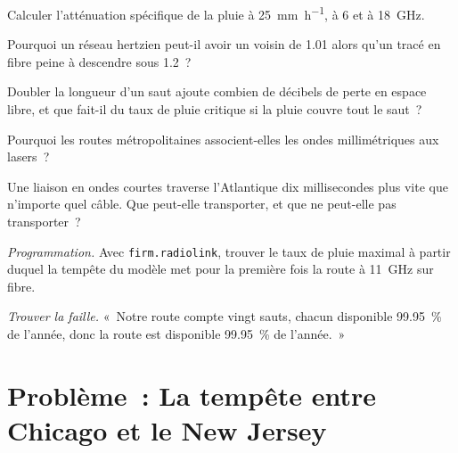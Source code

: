 \begin{exercise}[$\star$]\label{exo:nw:long-haul-wireless:2}
Calculer l'atténuation spécifique de la pluie à \qty{25}{\milli\metre\per\hour}, à 6 et à \qty{18}{\giga\hertz}.
\end{exercise}

\begin{exercise}[$\star$]\label{exo:nw:long-haul-wireless:3}
Pourquoi un réseau hertzien peut-il avoir un  voisin de 1.01 alors qu'un tracé en fibre peine à descendre sous 1.2~?
\end{exercise}

\begin{exercise}[$\star\star$]\label{exo:nw:long-haul-wireless:4}
Doubler la longueur d'un saut ajoute combien de décibels de perte en espace libre, et que fait-il du taux de pluie critique si la pluie couvre tout le saut~?
\end{exercise}

\begin{exercise}[$\star\star$]\label{exo:nw:long-haul-wireless:5}
Pourquoi les routes métropolitaines associent-elles les ondes millimétriques aux lasers~?
\end{exercise}

\begin{exercise}[$\star\star$]\label{exo:nw:long-haul-wireless:6}
Une liaison en ondes courtes traverse l'Atlantique dix millisecondes plus vite que n'importe quel câble. Que peut-elle transporter, et que ne peut-elle pas transporter~?
\end{exercise}

\begin{exercise}[$\star\star\star$]\label{exo:nw:long-haul-wireless:7}
\emph{Programmation.} Avec \texttt{firm.radiolink}, trouver le taux de pluie maximal à partir duquel la tempête du modèle met pour la première fois la route à \qty{11}{\giga\hertz} sur fibre.
\end{exercise}

\begin{exercise}[$\star\star\star$]\label{exo:nw:long-haul-wireless:8}
\emph{Trouver la faille.} «~Notre route compte vingt sauts, chacun disponible 99.95~\% de l'année, donc la route est disponible 99.95~\% de l'année.~»
\end{exercise}

\section{Problème~: La tempête entre Chicago et le New Jersey}

